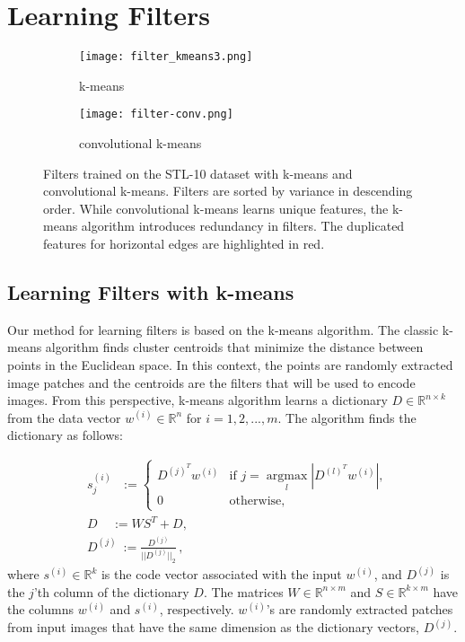 \documentclass{article} \usepackage{iclr2016_workshop,times}
\DeclareMathOperator*{\argmax}{argmax}
\newcommand*{\argmaxl}{\argmax\limits}
\begin{document}
\section{Learning Filters}
\label{sec:kmeans}
\begin{figure*}
  \centering
  \begin{subfigure}[b]{0.5\textwidth}
    \centering
    \texttt{[image: filter\_kmeans3.png]}
    \caption{ k-means}
    \label{fig:filters-kmeans}
  \end{subfigure}\begin{subfigure}[b]{0.5\textwidth}
      \centering
    \texttt{[image: filter-conv.png]}
    \caption{convolutional k-means}
    \label{fig:filters-conv}
  \end{subfigure}
  \caption{Filters trained on the STL-10 dataset with k-means and convolutional k-means.
  Filters are sorted by variance in descending order. While convolutional k-means learns unique features, the k-means algorithm introduces redundancy in filters.
  The duplicated features for horizontal edges are highlighted in red.}
  \label{fig:filters}
\end{figure*}

\subsection{Learning Filters with k-means}


Our method for learning filters is based on the k-means algorithm.
The classic k-means algorithm finds cluster centroids that minimize the distance between points in the Euclidean space. In this context, the points are randomly extracted image patches and the centroids are the filters that will be used to encode images. From this perspective, k-means algorithm learns a dictionary $D \in \mathbb{R} ^{n \times k}$ from the data vector $w^{(i)} \in \mathbb{R} ^{n}$ for $i=1,2,...,m$.
The algorithm finds the dictionary as follows:

\begin{equation}
\begin{aligned}
 & s_j^{(i)} \ \ \ :=
  \begin{cases}
   D^{(j)^T}w^{(i)} & \text{if } j = \argmaxl_{l}  \left|D^{(l)^T}w^{(i)}\right|, \\
   0      & \text{otherwise,}
  \end{cases}\\
  & {D \ \ \ \ \ := WS^T+D},\\
  & {D^{(j)} \ := \frac{D^{(j)}}{||D^{(j)}||_2}}\, , 
 \end{aligned}
  \label{eq:kmeans}
\end{equation}
where $s^{(i)} \in \mathbb{R}^k$ is the code vector associated with the input $w^{(i)}$, and $D^{(j)}$ is the $j$'th column of the dictionary $D$. The matrices $W \in  \mathbb{R}^{n \times m}$ and $S\in \mathbb{R}^{k \times m}$ have the columns $w^{(i)}$ and $s^{(i)}$, respectively.
$w^{(i)}$'s are randomly extracted patches from input images that have the same dimension as the dictionary vectors, $D^{(j)}$. 
\end{document}
